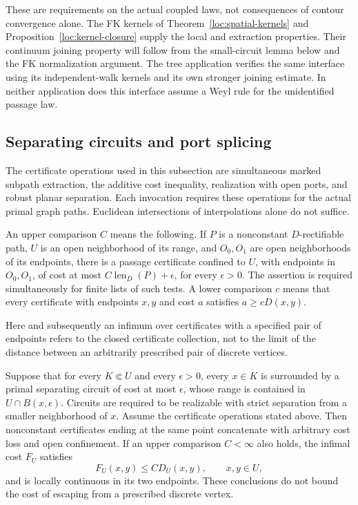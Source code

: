 These are requirements on the actual coupled laws, not consequences of
contour convergence alone.  The FK kernels of
Theorem~\ref{loc:spatial-kernels} and
Proposition~\ref{loc:kernel-closure} supply the local and extraction
properties.  Their continuum joining property will follow from the
small-circuit lemma below and the FK normalization argument.  The tree
application verifies the same interface using its independent-walk
kernels and its own stronger joining estimate.  In neither application
does this interface assume a Weyl rule for the unidentified passage law.

\subsection{Separating circuits and port splicing}

The certificate operations used in this subsection are simultaneous marked
subpath extraction, the additive cost inequality, realization with open
ports, and robust planar separation.  Each invocation requires these
operations for the actual primal graph paths.  Euclidean intersections of
interpolations alone do not suffice.

\begin{definition}\label{comp:port-upper}
An upper comparison $C$ means the following.  If $P$ is a nonconstant
$D$-rectifiable path, $U$ is an open neighborhood of its range, and $O_0,O_1$
are open neighborhoods of its endpoints, there is a passage certificate
confined to $U$, with endpoints in $O_0,O_1$, of cost at most
$C\operatorname{len}_D(P)+\epsilon$, for every $\epsilon>0$.
The assertion is required simultaneously for finite lists of such tests.
A lower comparison $c$ means that every certificate with endpoints $x,y$
and cost $a$ satisfies $a\ge cD(x,y)$.
\end{definition}

Here and subsequently an infimum over certificates with a specified pair of
endpoints refers to the closed certificate collection, not to the limit of
the distance between an arbitrarily prescribed pair of discrete vertices.

\begin{lemma}\label{comp:port-splicing}
Suppose that for every $K\Subset U$ and every $\epsilon>0$, every $x\in K$
is surrounded by a primal separating circuit of cost at most $\epsilon$,
whose range is contained in $U\cap B(x,\epsilon)$.  Circuits are required
to be realizable with strict separation from a smaller neighborhood of $x$.
Assume the certificate operations stated above.  Then nonconstant
certificates ending at the same point concatenate with arbitrary cost
loss and open confinement.  If an upper comparison $C<\infty$ also holds,
the infimal cost $F_U$ satisfies
\begin{equation}\label{comp:upper-internal}
 F_U(x,y)\le C D_U(x,y),\qquad x,y\in U,
\end{equation}
and is locally continuous in its two endpoints.  These conclusions do not
bound the cost of escaping from a prescribed discrete vertex.
\end{lemma}

